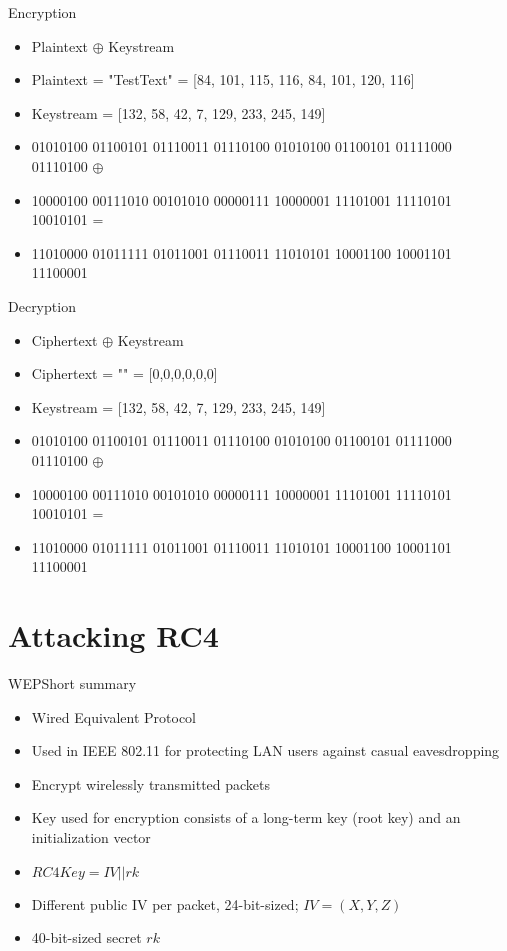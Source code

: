\documentclass[
	aspectratio=169,	%
	onlytextwidth,		%
	t,					%
	]{beamer}
\begin{document}
\begin{frame}[fragile]{Encryption}
	\small
	\begin{itemize}
		\item Plaintext $\oplus$ Keystream
		\item Plaintext = "TestText" = {\color{purple}[84, 101, 115, 116, 84, 101, 120, 116]}
		\item Keystream = {\color{olive}[132, 58, 42, 7, 129, 233, 245, 149]}
		\item {\color{purple}01010100 01100101 01110011 01110100 01010100 01100101 01111000 01110100} $\oplus$
		\item {\color{olive}10000100 00111010 00101010 00000111 10000001 11101001 11110101 10010101} = 
		\item 11010000 01011111 01011001 01110011 11010101 10001100 10001101 11100001
	\end{itemize}
	\normalsize
\end{frame}

\begin{frame}[fragile]{Decryption}
	\small
	\begin{itemize}
		\item Ciphertext $\oplus$ Keystream
		\item Ciphertext = "" = {\color{purple}[0,0,0,0,0,0]}
		\item Keystream = {\color{olive}[132, 58, 42, 7, 129, 233, 245, 149]} 
		\item {\color{purple}01010100 01100101 01110011 01110100 01010100 01100101 01111000 01110100} $\oplus$ 
		\item {\color{olive}10000100 00111010 00101010 00000111 10000001 11101001 11110101 10010101} = 
		\item 11010000 01011111 01011001 01110011 11010101 10001100 10001101 11100001
	\end{itemize}
	\normalsize
\end{frame}

\section{Attacking RC4}

\begin{frame}[fragile]{WEP}{Short summary}
	\begin{itemize}
		\item Wired Equivalent Protocol
		\item Used in IEEE 802.11 for protecting LAN users against casual eavesdropping
		\item Encrypt wirelessly transmitted packets
		\item Key used for encryption consists of a long-term key (root key) and an initialization vector
		\item $RC4Key = IV||rk$
		\item Different public IV per packet, 24-bit-sized; $IV=(X,Y,Z)$
		\item 40-bit-sized secret $rk$
	\end{itemize}
\end{frame}
\end{document}
